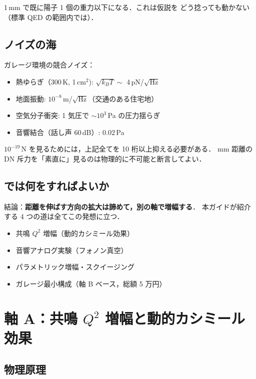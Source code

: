 \documentclass[11pt,a4paper]{article}
\begin{document}
1\,mm で既に陽子 1 個の重力以下になる．これは仮説を
どう捻っても動かない（標準 QED の範囲内では）．

\subsection{ノイズの海}

ガレージ環境の競合ノイズ：

\begin{itemize}
\item 熱ゆらぎ（300\,K, 1\,cm$^2$): $\sqrt{k_B T}\sim$ 4\,pN/$\sqrt{\mathrm{Hz}}$
\item 地面振動: $10^{-8}$\,m/$\sqrt{\mathrm{Hz}}$（交通のある住宅地）
\item 空気分子衝突: 1 気圧で $\sim 10^3$\,Pa の圧力揺らぎ
\item 音響結合（話し声 60\,dB）: $0.02$\,Pa
\end{itemize}

$10^{-19}$\,N を見るためには，上記全てを 10 桁以上抑える必要がある．
mm 距離の DN 斥力を「素直に」見るのは物理的に不可能と断言してよい．

\subsection{では何をすればよいか}

結論：\textbf{距離を伸ばす方向の拡大は諦めて，別の軸で増幅する}．
本ガイドが紹介する 4 つの道は全てこの発想に立つ．

\begin{tcolorbox}[colback=yellow!10,colframe=orange!50!black,title=4つの戦略]
\begin{itemize}
\item[\textbf{軸 A}] 共鳴 $Q^2$ 増幅（動的カシミール効果）
\item[\textbf{軸 B}] 音響アナログ実験（フォノン真空）
\item[\textbf{軸 C}] パラメトリック増幅・スクイージング
\item[\textbf{軸 D}] ガレージ最小構成（軸 B ベース，総額 5 万円）
\end{itemize}
\end{tcolorbox}

\newpage
\section{軸 A：共鳴 $Q^2$ 増幅と動的カシミール効果}

\subsection{物理原理}
\end{document}

